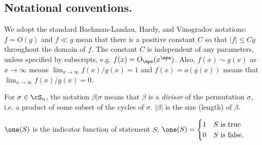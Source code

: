 \subsection{Notational conventions.}
We adopt the standard Bachman-Landau, Hardy, and Vinogradov notations:
$f=O(g)$ and $f\ll g$ mean that there is a positive constant $C$
so that $|f| \le Cg$ throughout the domain of $f$.  The constant $C$ is independent of any parameters, unless specified by subscripts, e.g.
$f(x)=O_{\eps} (x^\eps)$.
Also, $f(x) \sim g(x)$ as $x\to \infty$ means $\lim_{x\to \infty} f(x)/g(x)=1$
and $f(x)=o(g(x))$ means that $\lim_{x\to\infty} f(x)/g(x)=0$.

For $\sigma\in \cS_n$, the notation
$\beta|\sigma$ means that $\beta$ is a \emph{divisor} of the permutation
$\sigma$, i.e. a product of some subset of the cycles of $\sigma$.
$|\beta|$ is the size (length) of $\beta$.

$\one(S)$ is the indicator function of statement $S$; $\displaystyle \one(S) = 
\begin{cases} 1 & S \text{ is true} \\ 0 & S \text{ is false}. \end{cases}$

